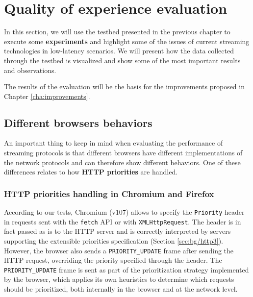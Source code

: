 \chapter{Quality of experience evaluation}
\label{cha:eval}

In this section, we will use the testbed presented in the previous chapter to execute some \textbf{experiments} and highlight some of the issues of current streaming technologies in low-latency scenarios. We will present how the data collected through the testbed is visualized and show some of the most important results and observations.

The results of the evaluation will be the basis for the improvements proposed in Chapter \ref{cha:improvements}.

\section{Different browsers behaviors}
\label{sec:eval/browsers}

An important thing to keep in mind when evaluating the performance of streaming protocols is that different browsers have different implementations of the network protocols and can therefore show different behaviors. One of these differences relates to how \textbf{HTTP priorities} are handled.

\subsection{HTTP priorities handling in Chromium and Firefox}
\label{sec:eval/browsers/priorities}

According to our tests, Chromium (v107) allows to specify the \texttt{Priority} header in requests sent with the \texttt{fetch} API or with \texttt{XMLHttpRequest}. The header is in fact passed as is to the HTTP server and is correctly interpreted by servers supporting the extensible priorities specification (Section \ref{sec:bg/http3}). However, the browser also sends a \texttt{PRIORITY\_UPDATE} frame after sending the HTTP request, overriding the priority specified through the header. The \texttt{PRIORITY\_UPDATE} frame is sent as part of the prioritization strategy implemented by the browser, which applies its own heuristics to determine which requests should be prioritized, both internally in the browser and at the network level.


